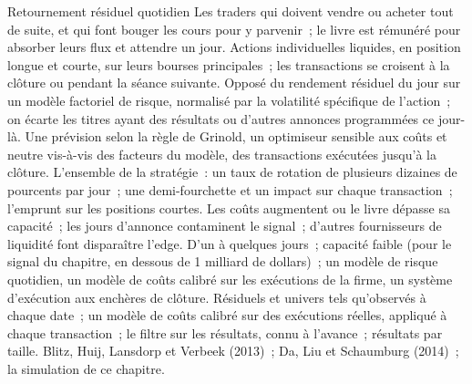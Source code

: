 \begin{strategyfile}{Retournement résiduel quotidien}\label{strat:s1:short-term-reversal:daily}
 Les traders qui doivent vendre ou acheter tout de suite, et qui font bouger les cours pour y parvenir~; le livre est rémunéré pour absorber leurs flux et attendre un jour.
 Actions individuelles liquides, en position longue et courte, sur leurs bourses principales~; les transactions se croisent à la clôture ou pendant la séance suivante.
 Opposé du rendement résiduel du jour sur un modèle factoriel de risque, normalisé par la volatilité spécifique de l'action~; on écarte les titres ayant des résultats ou d'autres annonces
programmées ce jour-là.
 Une prévision selon la règle de Grinold, un optimiseur sensible aux coûts et neutre vis-à-vis des facteurs du modèle, des transactions exécutées jusqu'à la clôture.
 L'ensemble de la stratégie~: un taux de rotation de plusieurs dizaines de pourcents par jour~; une demi-fourchette et un impact sur chaque transaction~; l'emprunt sur les positions courtes.
 Les coûts augmentent ou le livre dépasse sa capacité~; les jours d'annonce contaminent le signal~; d'autres fournisseurs de liquidité font disparaître l'edge.
 D'un à quelques jours~; capacité faible (pour le signal du chapitre, en dessous de 1 milliard de dollars)~; un modèle de risque quotidien, un modèle de coûts
calibré sur les exécutions de la firme, un système d'exécution aux enchères de clôture.
 Résiduels et univers tels qu'observés à chaque date~; un modèle de coûts calibré sur des exécutions réelles, appliqué à chaque transaction~; le filtre sur les résultats, connu à l'avance~;
résultats par taille.
 Blitz, Huij, Lansdorp et Verbeek (2013)~; Da, Liu et Schaumburg (2014)~; la simulation de ce chapitre.
\end{strategyfile}

